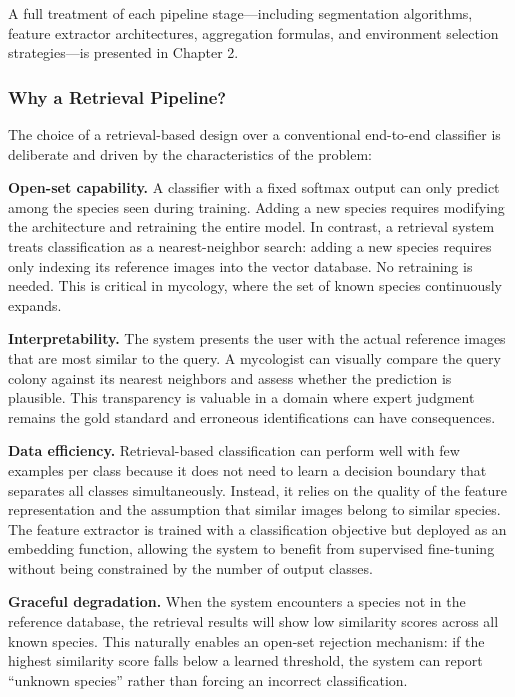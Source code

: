 A full treatment of each pipeline stage---including segmentation algorithms, feature extractor architectures, aggregation formulas, and environment selection strategies---is presented in Chapter 2.

\subsubsection{Why a Retrieval Pipeline?}\label{why-a-retrieval-pipeline}

The choice of a retrieval-based design over a conventional end-to-end classifier is deliberate and driven by the characteristics of the problem:

\textbf{Open-set capability.} A classifier with a fixed softmax output can only predict among the species seen during training. Adding a new species requires modifying the architecture and retraining the entire model. In contrast, a retrieval system treats classification as a nearest-neighbor search: adding a new species requires only indexing its reference images into the vector database. No retraining is needed. This is critical in mycology, where the set of known species continuously expands.

\textbf{Interpretability.} The system presents the user with the actual reference images that are most similar to the query. A mycologist can visually compare the query colony against its nearest neighbors and assess whether the prediction is plausible. This transparency is valuable in a domain where expert judgment remains the gold standard and erroneous identifications can have consequences.

\textbf{Data efficiency.} Retrieval-based classification can perform well with few examples per class because it does not need to learn a decision boundary that separates all classes simultaneously. Instead, it relies on the quality of the feature representation and the assumption that similar images belong to similar species. The feature extractor is trained with a classification objective but deployed as an embedding function, allowing the system to benefit from supervised fine-tuning without being constrained by the number of output classes.

\textbf{Graceful degradation.} When the system encounters a species not in the reference database, the retrieval results will show low similarity scores across all known species. This naturally enables an open-set rejection mechanism: if the highest similarity score falls below a learned threshold, the system can report ``unknown species'' rather than forcing an incorrect classification.

